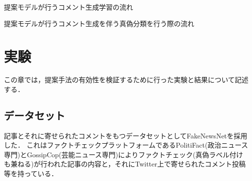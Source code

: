 \begin{algorithm}[h]
    \caption{提案モデルが行うコメント生成学習の流れ}
    \label{alg:generate}
    \begin{algorithmic}[1]
                \EndIf
                    \EndIf
                \EndFor
            \EndFor
        \EndProcedure

                    \EndWhile
                \EndFor
            \EndFor
        \EndProcedure
    \end{algorithmic}
\end{algorithm}

\begin{algorithm}
    \caption{提案モデルが行うコメント生成を伴う真偽分類を行う際の流れ}
    \label{alg:classify}
    \begin{algorithmic}[1]
            \EndFor
        \EndProcedure
    \end{algorithmic}
\end{algorithm}


\section{実験}\label{sec:gen_exp}
この章では，提案手法の有効性を検証するために行った実験と結果について記述する．

\subsection{データセット}
\label{sec:dataset}
記事とそれに寄せられたコメントをもつデータセットとしてFakeNewsNet\cite{Shu2018FakeNewsNetAD}を採用した．
これはファクトチェックプラットフォームであるPolitiFact(政治ニュース専門)とGossipCop(芸能ニュース専門)によりファクトチェック(真偽ラベル付けも兼ねる)が行われた記事の内容と，それにTwitter上で寄せられたコメント投稿等を持っている．

